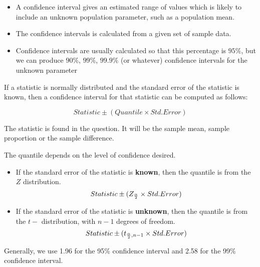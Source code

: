 \documentclass[]{report}
\begin{document}
\begin{itemize}
\item A confidence interval gives an estimated range of values which is likely to include an unknown population parameter, such as a population mean.

\item 
The confidence intervals is calculated from a given set of sample data.

\item 
Confidence intervals are usually calculated so that this percentage is $95\%$, but we can produce $90\%$, $99\%$, $99.9\%$ (or whatever) confidence intervals for the unknown parameter

\end{itemize}




{

If a statistic is normally distributed and the standard error of the statistic is known, 
then a confidence interval for that statistic can be computed as follows:

\[
Statistic \pm (Quantile \times Std. Error)
\]

The statistic is found in the question. It will be the sample mean, sample proportion or the sample difference.
}

{

The quantile depends on the level of confidence desired. 

\begin{itemize}
\item If the standard error of the statistic is \textbf{known}, then the quantile is from the $Z$ distribution.
\[
Statistic \pm (Z_{{\alpha\over 2}} \times Std. Error)
\]
\item If the standard error of the statistic is \textbf{unknown}, then the quantile is from the $t-$ distribution, with $n-1$ degrees of freedom.
\[
Statistic \pm (t_{{\alpha\over 2},n-1} \times Std. Error)
\]

\end{itemize}
Generally, we use 1.96 for the 95\% confidence interval and 2.58 for the 99\% confidence interval.
}





\end{document}
